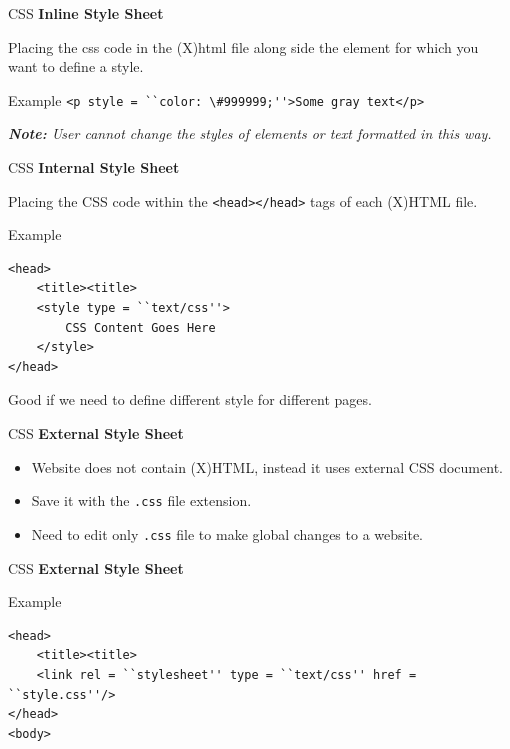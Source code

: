 \documentclass[14pt]{beamer}
\begin{document}
\begin{frame}{CSS}
\textbf{Inline Style Sheet}

Placing the css code in the (X)html file along side the element for which you want to define a style. 
\begin{block}{Example}
\lstinline!<p style = ``color: \#999999;''>Some gray text</p>!

\color{gray}{Some gray text}
\end{block}

\emph{\textbf{Note:} User cannot change  the styles of elements or text formatted in this way.}
\end{frame}

\begin{frame}[fragile]{CSS}
\textbf{Internal Style Sheet}

Placing the CSS code within the \lstinline!<head></head>! tags of each (X)HTML file.
\begin{block}{Example}
\begin{lstlisting}
<head>
    <title><title>
    <style type = ``text/css''>
        CSS Content Goes Here
    </style>
</head>
\end{lstlisting}
\end{block}
Good if we need to define different style for different pages.
\end{frame}

\begin{frame}{CSS}
\textbf{External Style Sheet}

\begin{itemize}
 \item Website does not contain (X)HTML, instead it uses external CSS document.
 \item Save it with the \lstinline!.css! file extension.
 \item Need to edit only \lstinline!.css! file to make global changes to a website.
\end{itemize}
\end{frame}

\begin{frame}[fragile]{CSS}
\textbf{External Style Sheet}
\begin{block}{Example}
\begin{lstlisting}
<head>
    <title><title>
    <link rel = ``stylesheet'' type = ``text/css'' href = ``style.css''/>
</head>
<body>
\end{lstlisting}
\end{block}
\end{frame}
\end{document}
